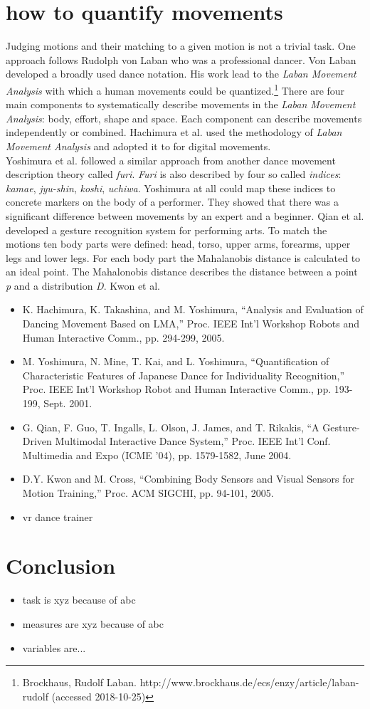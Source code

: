 \section{how to quantify movements}
Judging motions and their matching to a given motion is not a trivial task. One approach follows Rudolph von Laban who was a professional dancer. Von Laban developed a broadly used dance notation. His work lead to the \textit{Laban Movement Analysis} with which a human movements could be quantized.\footnote{Brockhaus, Rudolf Laban. http://www.brockhaus.de/ecs/enzy/article/laban-rudolf (accessed 2018-10-25)} There are four main components to systematically describe movements in the \textit{Laban Movement Analysis}: body, effort, shape and space. Each component can describe movements independently or combined. Hachimura et al. \todo used the methodology  of \textit{Laban Movement Analysis} and adopted it to for digital movements.\\
Yoshimura et al. \todo followed a similar approach from another dance movement description theory called \textit{furi}. \textit{Furi} is also described by four so called \textit{indices}: \textit{kamae}, \textit{jyu-shin}, \textit{koshi}, \textit{uchiwa}. Yoshimura at all could map these indices to concrete markers on the body of a performer. They showed that there was a significant difference between movements by an expert and a beginner. Qian et al. \todo developed a gesture recognition system for performing arts. To match the motions ten body parts were defined: head, torso, upper arms, forearms, upper legs and lower legs. For each body part the Mahalanobis distance is calculated to an ideal point. The Mahalonobis distance describes the distance between a point \textit{p} and a distribution \textit{D}. Kwon et al. \todo 
\begin{itemize}
	\item K. Hachimura, K. Takashina, and M. Yoshimura, “Analysis and
	Evaluation of Dancing Movement Based on LMA,” Proc. IEEE Int’l
	Workshop Robots and Human Interactive Comm., pp. 294-299, 2005.
	\item M. Yoshimura, N. Mine, T. Kai, and L. Yoshimura, “Quantification	of Characteristic Features of Japanese Dance for Individuality Recognition,” Proc. IEEE Int’l Workshop Robot and Human Interactive Comm., pp. 193-199, Sept. 2001.
	\item G. Qian, F. Guo, T. Ingalls, L. Olson, J. James, and T. Rikakis, “A	Gesture-Driven Multimodal Interactive Dance System,” Proc. IEEE	Int’l Conf. Multimedia and Expo (ICME ’04), pp. 1579-1582, June	2004.
	\item D.Y. Kwon and M. Cross, “Combining Body Sensors and Visual
	Sensors for Motion Training,” Proc. ACM SIGCHI, pp. 94-101,	2005.
	\item vr dance trainer
\end{itemize}
\section{Conclusion}
\begin{itemize}
	\item task is xyz because of abc
	\item measures are xyz because of abc
	\item variables are...
\end{itemize}
